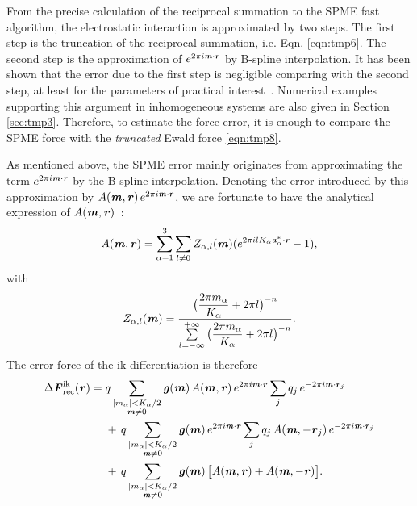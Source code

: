\documentclass[aps,pre,preprint,unsortedaddress]{revtex4}
\renewcommand{\v}[1]{\textbf{\textit{#1}}}
\begin{document}
From the precise calculation of the reciprocal summation to the SPME
fast algorithm, the electrostatic interaction is approximated by two
steps.  The first step is the truncation of the reciprocal summation,
i.e. Eqn. \eqref{eqn:tmp6}. The second step is the approximation of
$e^{2\pi i\v m\cdot\v r}$ by B-spline
interpolation. It has been shown that the
error due to the first step is negligible comparing with the second
step,
at least for the parameters of practical interest~\cite{wang2010optimizing}.
Numerical
examples supporting this argument in inhomogeneous systems are also
given in Section \ref{sec:tmp3}.  Therefore, to estimate the force
error, it is enough to compare the SPME force with the
\emph{truncated} Ewald force \eqref{eqn:tmp8}. 

As mentioned above, the SPME error mainly originates from approximating
the term $e^{2\pi i\v m\cdot\v r}$ by the B-spline
interpolation. Denoting the error introduced by this approximation by
$A(\v m, \v r)\,e^{2\pi i\v m\cdot \v r}$, we are fortunate to have
the analytical expression of $A(\v m, \v r)$~\cite{schoenberg1987cardinal}:
\begin{align}\label{eqn:error-A}
  A(\v m, \v r)
  =
  \sum_{\alpha=1}^3\sum_{l\neq 0}
  Z_{\alpha,l}(\v m)
  (
  e^{2\pi i l K_\alpha\v a^\ast_\alpha\cdot \v r} - 1
  ),
\end{align}
with
\begin{align}
  Z_{\alpha,l}(\v m) = \frac
  {\big(\dfrac{2\pi m_\alpha}{K_\alpha} + 2\pi l\big)^{-n}}
  {\sum\limits_{l=-\infty}^{+\infty}
    \big(\dfrac{2\pi m_\alpha}{K_\alpha} + 2\pi l\big)^{-n}}.
\end{align}
The error force of the ik-differentiation is therefore
\begin{align}\nonumber
  \Delta\v F_{\textrm{rec}}^{\textrm{ik}}(\v r)
  =\;&
  q
  \sum_{
    \begin{subarray}{c}
      \vert m_{\alpha}\vert < K_\alpha/2\\
      \v m\neq 0
    \end{subarray}}
  \v g(\v m)\,
  A(\v m, \v r)\,
  e^{2\pi i\v m\cdot \v r}
  \sum_{j}q_j\,e^{-2\pi i\v m\cdot\v r_j} \\\nonumber
  & +\,
  q
  \sum_{
    \begin{subarray}{c}
      \vert m_{\alpha}\vert < K_\alpha/2\\
      \v m\neq 0
    \end{subarray}}
  \v g(\v m)\,
  e^{2\pi i\v m\cdot \v r}
  \sum_{j}q_j\,A(\v m, -\v r_j)\,e^{-2\pi i\v m\cdot\v r_j}\\\label{eqn:ik.error.force.1}
  & +\,
  q
  \sum_{
    \begin{subarray}{c}
      \vert m_{\alpha}\vert < K_\alpha/2\\
      \v m\neq 0
    \end{subarray}}
  \v g(\v m)\,
  \big[
  A(\v m, \v r) +
  A(\v m, -\v r)
  \big].
\end{align}
\end{document}
